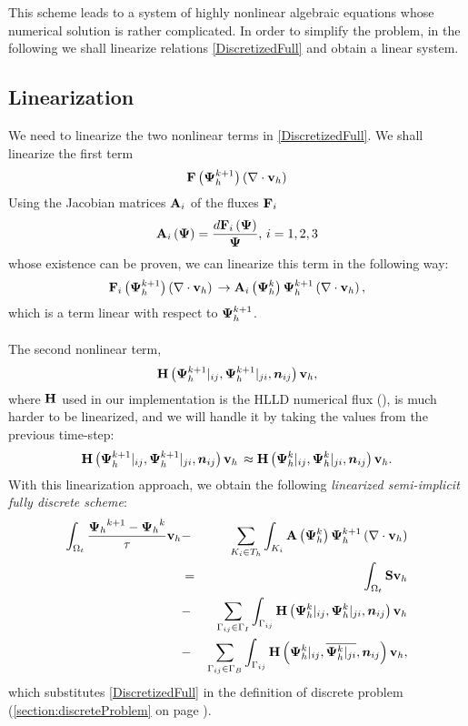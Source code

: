 This scheme leads to a system of highly nonlinear algebraic equations whose numerical solution is rather complicated. In order to simplify the problem, in the following we shall linearize relations \ref{DiscretizedFull} and obtain a linear system.
\subsection{Linearization}
We need to linearize the two nonlinear terms in \ref{DiscretizedFull}. We shall linearize the first term
$$
\mathrm{\mathbf{F}}\left({\mathrm{\mathbf{\Psi}}_h^{k+1}}\right) \left(\nabla \cdot \mathrm{\mathbf{v}}_h\right)
$$
Using the Jacobian matrices $\mathrm{\mathbf{A}}_i$ of the fluxes $\mathrm{\mathbf{F}}_i$
$$
\mathrm{\mathbf{A}}_i\left({\mathrm{\mathbf{\Psi}}}\right) = \frac{d\mathrm{\mathbf{F}}_i\left({\mathrm{\mathbf{\Psi}}}\right)}{\mathrm{\mathbf{\Psi}}},\,i = 1, 2, 3
$$
whose existence can be proven, we can linearize this term in the following way:
$$
\mathrm{\mathbf{F}}_i\left({\mathrm{\mathbf{\Psi}}_h^{k+1}}\right) \left(\nabla \cdot \mathrm{\mathbf{v}}_h\right)\,\rightarrow \mathrm{\mathbf{A}}_i\left({\mathrm{\mathbf{\Psi}}_h^{k}}\right) \mathrm{\mathbf{\Psi}}_h^{k+1} \left(\nabla \cdot \mathrm{\mathbf{v}}_h\right),
$$
which is a term linear with respect to $\mathrm{\mathbf{\Psi}}_h^{k+1}$.

\paragraph{}
The second nonlinear term,
$$
\mathrm{\mathbf{H}}\left({\mathrm{\mathbf{\Psi}}_h^{k+1}}|_{ij}, {\mathrm{\mathbf{\Psi}}_h^{k+1}}|_{ji}, \mbox{\boldmath $n$}_{ij}\right) \mathrm{\mathbf{v}}_h,
$$
where $\mathrm{\mathbf{H}}$ used in our implementation is the HLLD numerical flux (\citep{hlld}), is much harder to be linearized, and we will handle it by taking the values from the previous time-step:
$$
\mathrm{\mathbf{H}}\left({\mathrm{\mathbf{\Psi}}_h^{k+1}}|_{ij}, {\mathrm{\mathbf{\Psi}}_h^{k+1}}|_{ji}, \mbox{\boldmath $n$}_{ij}\right) \mathrm{\mathbf{v}}_h\,\approx  \mathrm{\mathbf{H}}\left({\mathrm{\mathbf{\Psi}}_h^{k}}|_{ij}, {\mathrm{\mathbf{\Psi}}_h^{k}}|_{ji}, \mbox{\boldmath $n$}_{ij}\right) \mathrm{\mathbf{v}}_h.
$$
With this linearization approach, we obtain the following \textit{linearized semi-implicit fully discrete scheme}:
\begin{eqnarray}
\label{DiscretizedLinear} \int_{\Omega_{t}} \frac{{\mathrm{\mathbf{\Psi}}_h}^{k+1} - {\mathrm{\mathbf{\Psi}}_h}^{k}}{\tau} \mathrm{\mathbf{v}}_h & - & \sum_{K_i \in T_h}\int_{K_i}\mathrm{\mathbf{A}}\left({\mathrm{\mathbf{\Psi}}_h^{k}}\right) \mathrm{\mathbf{\Psi}}_h^{k+1} \left(\nabla \cdot \mathrm{\mathbf{v}}_h\right)\\\nonumber & = & \int_{\Omega_{t}} \mathrm{\mathbf{S}} \mathrm{\mathbf{v}}_h\\\nonumber & - &\sum_{\Gamma_{ij}\in\Gamma_I} \int_{\Gamma_{ij}}\mathrm{\mathbf{H}}\left({\mathrm{\mathbf{\Psi}}_h^{k}}|_{ij}, {\mathrm{\mathbf{\Psi}}_h^{k}}|_{ji}, \mbox{\boldmath $n$}_{ij}\right) \mathrm{\mathbf{v}}_h
\\\nonumber & - &\sum_{\Gamma_{ij}\in\Gamma_B} \int_{\Gamma_{ij}} \mathrm{\mathbf{H}}\left({\mathrm{\mathbf{\Psi}}_h^{k}}|_{ij}, \overline{{\mathrm{\mathbf{\Psi}}_h^{k}}|_{ji}}, \mbox{\boldmath $n$}_{ij}\right) \mathrm{\mathbf{v}}_h,
\end{eqnarray}
which substitutes \ref{DiscretizedFull} in the definition of discrete problem (\ref{section:discreteProblem} on page \pageref{section:discreteProblem}).